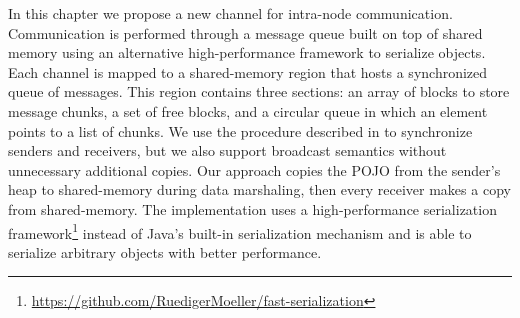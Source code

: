 In this chapter we propose a new channel for intra-node communication.
Communication is performed through a message queue built on top of shared memory using an alternative high-performance framework to serialize objects.
Each channel is mapped to a shared-memory region that hosts a synchronized queue of messages.
This region contains three sections: an array of blocks to store message chunks, 
a set of free blocks, and a circular queue in which an element points to a list of chunks.
We use the procedure described in \cite{Unrau:708530} to synchronize senders and receivers, but we also support broadcast semantics without unnecessary additional copies.
Our approach copies the POJO from the sender's heap to shared-memory during data marshaling, then every receiver makes a copy from shared-memory.
The implementation uses a high-performance serialization framework\footnote{\url{https://github.com/RuedigerMoeller/fast-serialization}}
instead of Java's built-in serialization mechanism
and is able to serialize arbitrary objects with better performance.
